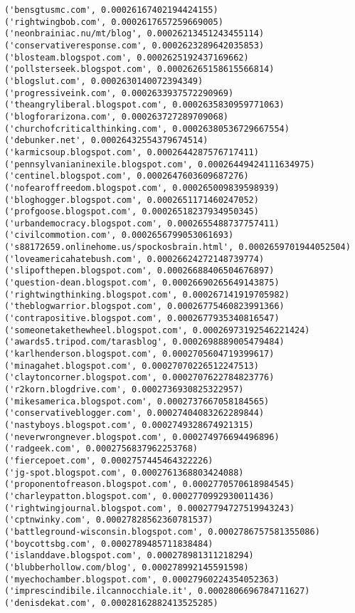 \documentclass[11pt]{article}
\begin{document}
\begin{Verbatim}[commandchars=\\\{\}]
('bensgtusmc.com', 0.00026167402194424155)
('rightwingbob.com', 0.0002617657259669005)
('neonbrainiac.nu/mt/blog', 0.00026213451243455114)
('conservativeresponse.com', 0.0002623289642035853)
('blosteam.blogspot.com', 0.0002625192437169662)
('pollsterseek.blogspot.com', 0.00026265158615566814)
('blogslut.com', 0.0002630140072394349)
('progressiveink.com', 0.0002633937572290969)
('theangryliberal.blogspot.com', 0.0002635830959771063)
('blogforarizona.com', 0.000263727289709068)
('churchofcriticalthinking.com', 0.00026380536729667554)
('debunker.net', 0.00026432554379674514)
('karmicsoup.blogspot.com', 0.0002644287576717411)
('pennsylvanianinexile.blogspot.com', 0.00026449424111634975)
('centinel.blogspot.com', 0.0002647603609687276)
('nofearoffreedom.blogspot.com', 0.000265009839598939)
('bloghogger.blogspot.com', 0.0002651171460247052)
('profgoose.blogspot.com', 0.00026518237934950345)
('urbandemocracy.blogspot.com', 0.0002655488737757411)
('civilcommotion.com', 0.0002656799053061693)
('s88172659.onlinehome.us/spockosbrain.html', 0.0002659701944052504)
('loveamericahatebush.com', 0.00026624272148739774)
('slipofthepen.blogspot.com', 0.00026688406504676897)
('question-dean.blogspot.com', 0.00026690265649143875)
('rightwingthinking.blogspot.com', 0.000267141919705982)
('theblogwarrior.blogspot.com', 0.00026775460823991366)
('contrapositive.blogspot.com', 0.0002677935340816547)
('someonetakethewheel.blogspot.com', 0.00026973192546221424)
('awards5.tripod.com/tarasblog', 0.0002698889005479484)
('karlhenderson.blogspot.com', 0.0002705604719399617)
('minagahet.blogspot.com', 0.00027070226512247513)
('claytoncorner.blogspot.com', 0.0002707622784823776)
('r2korn.blogdrive.com', 0.0002736930825322957)
('mikesamerica.blogspot.com', 0.0002737667058184565)
('conservativeblogger.com', 0.00027404083262289844)
('nastyboys.blogspot.com', 0.0002749328674921315)
('neverwrongnever.blogspot.com', 0.000274976694496896)
('radgeek.com', 0.0002756837962253768)
('fiercepoet.com', 0.0002757445464322226)
('jg-spot.blogspot.com', 0.0002761368803424088)
('proponentofreason.blogspot.com', 0.0002770570618984545)
('charleypatton.blogspot.com', 0.0002770992930011436)
('rightwingjournal.blogspot.com', 0.00027794727519943243)
('cptnwinky.com', 0.00027828562360781537)
('battleground-wisconsin.blogspot.com', 0.0002786757581355086)
('boycottsbg.com', 0.0002789485711838484)
('islanddave.blogspot.com', 0.000278981311218294)
('blubberhollow.com/blog', 0.000278992145591598)
('myechochamber.blogspot.com', 0.00027960224354052363)
('imprescindibile.ilcannocchiale.it', 0.0002806696784711627)
('denisdekat.com', 0.00028162882413525285)

\end{Verbatim}
\end{document}
